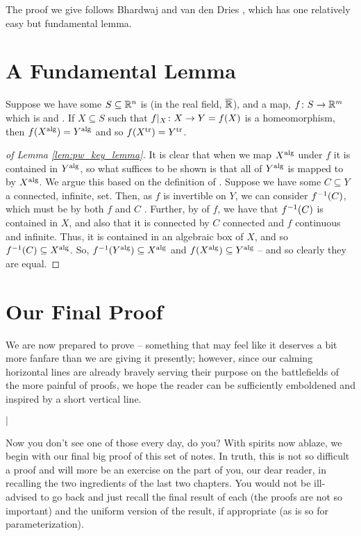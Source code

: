 The proof we give follows Bhardwaj and van den Dries \cite{bhardwaj_pilawilkie_2022}, which has one relatively easy but fundamental lemma.

\section{A Fundamental Lemma}

\begin{lemma}
  Suppose we have some $S \subseteq \R^n$ is \sa ( in the real field, $\overline{\R}$), and a map, $\funcdom{f}{S}{\R^m}$ which is \sa and \inj. If $X \subseteq S$ such that $\funcrestr{f}{X} \colon X \to Y = f(X)$ is a homeomorphism, then $f(\Xalg[X]) = \Xalg[Y]$ and so $f(\Xtr[X]) = \Xtr[Y]$.
  \label{lem:pw_key_lemma}
\end{lemma}

\begin{proof}[of Lemma \ref{lem:pw_key_lemma}]
  It is clear that when we map $\Xalg[X]$ under $f$ it is contained in $\Xalg[Y]$, so what suffices to be shown is that all of $\Xalg[Y]$ is mapped to by $\Xalg[X]$. We argue this based on the definition of \saty. Suppose we have some $C \subseteq Y$ a connected, infinite, \sa set. Then, as $f$ is invertible on $Y$, we can consider $\inv{f}(C)$, which must be \sa by both $f$ and $C$ \sa. Further, by \injtvty of $f$, we have that $\inv{f}(C)$ is contained in $X$, and also that it is connected by $C$ connected and $f$ continuous and infinite. Thus, it is contained in an algebraic box of $X$, and so $\inv{f}(C) \subseteq \Xalg[X]$. So, $\inv{f}(\Xalg[Y]) \subseteq \Xalg[X]$ and $f(\Xalg[X]) \subseteq \Xalg[Y]$ -- and so clearly they are equal.
\end{proof}


\section{Our Final Proof}

We are now prepared to prove \pw -- something that may feel like it deserves a bit more fanfare than we are giving it presently; however, since our calming horizontal lines are already bravely serving their purpose on the battlefields of the more painful of proofs, we hope the reader can be sufficiently emboldened and inspired by a short vertical line.

\medskip
\centerline{$\mid$}
\medskip

Now you don't see one of those every day, do you? With spirits now ablaze, we begin with our final big proof of this set of notes. In truth, this is not so difficult a proof and will more be an exercise on the part of you, our dear reader, in recalling the two ingredients of the last two chapters. You would not be ill-advised to go back and just recall the final result of each (the proofs are not so important) and the uniform version of the result, if appropriate (as is so for parameterization).

